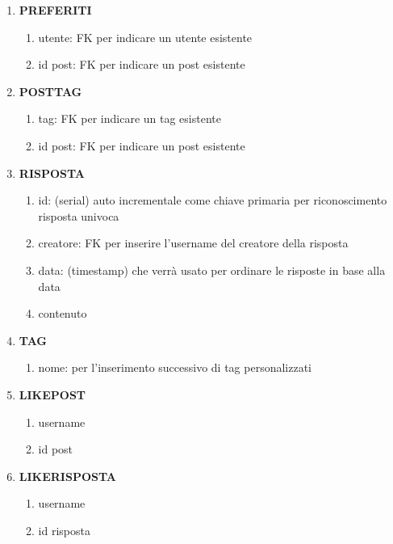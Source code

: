\documentclass{article} %
\begin{document}
\begin{enumerate}[label*={\arabic*.}]
\begin{enumerate}[label*={\arabic*.}]
            \end{enumerate}    
        \item \textbf{PREFERITI}
            \begin{enumerate}[label*={\arabic*.}]
                \item utente: FK per indicare un utente esistente  
                \item id post: FK per indicare un post esistente 
            \end{enumerate}
        \item \textbf{POSTTAG}
            \begin{enumerate}[label*={\arabic*.}]
                \item tag: FK per indicare un tag esistente  
                \item id post: FK per indicare un post esistente 
            \end{enumerate}
        \item \textbf{RISPOSTA}
            \begin{enumerate}[label*={\arabic*.}]
                \item id: (serial) auto incrementale come chiave primaria per riconoscimento risposta univoca
                \item creatore: FK per inserire l'username del creatore della risposta
                \item data: (timestamp) che verrà usato per ordinare le risposte in base alla data
                \item contenuto
            \end{enumerate}
        \item \textbf{TAG}
            \begin{enumerate}[label*={\arabic*.}]
                \item nome: per l'inserimento successivo di tag personalizzati
            \end{enumerate}
        \item \textbf{LIKEPOST}
            \begin{enumerate}[label*={\arabic*.}]
                \item username
                \item id post
            \end{enumerate}
        \item \textbf{LIKERISPOSTA}
            \begin{enumerate}[label*={\arabic*.}]
                \item username
                \item id risposta
            \end{enumerate}
    \end{enumerate}
\end{document}
